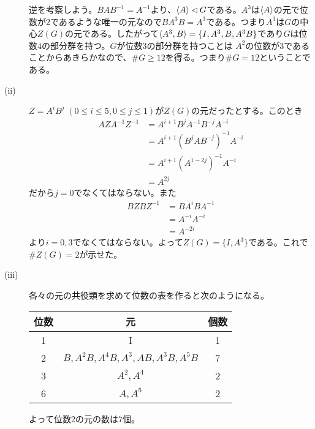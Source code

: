 \begin{sol}
\begin{description}
    逆を考察しよう。$BAB^{-1} = A^{-1}$より、$\langle A \rangle \lhd G$である。$A^3$は$\langle A \rangle$の元で位数が$2$であるような唯一の元なので$BA^3B = A^3$である。つまり$A^3$は$G$の中心$Z(G)$の元である。したがって$\langle A^3, B \rangle = \{ I, A^3, B , A^3B\}$であり$G$は位数$4$の部分群を持つ。$G$が位数$3$の部分群を持つことは
    $A^2$の位数が$3$であることからあきらかなので、$\# G \geq 12$を得る。つまり$\# G =12$ということである。
    \item[(ii)] $Z = A^i B^j \; (0 \leq i \leq 5, 0\leq j \leq 1)$が$Z(G)$の元だったとする。このとき
    \begin{align*}
      AZA^{-1}Z^{-1} &= A^{i+1} B^j A^{-1} B^{-j} A^{-i} \\
      &= A^{i+1} (B^j A B^{-j})^{-1} A^{-i} \\
      &= A^{i+1} (A^{1-2j})^{-1} A^{-i} \\
      &= A^{2j}
    \end{align*}
    だから$j=0$でなくてはならない。また
    \begin{align*}
      BZBZ^{-1} &= BA^i B A^{-1} \\
      &= A^{-i } A^{-i} \\
      &= A^{-2i}
    \end{align*}
    より$i=0,3$でなくてはならない。よって$Z(G)= \{ I, A^3 \}$である。これで$\# Z(G)=2$が示せた。
    \item[(iii)] 各々の元の共役類を求めて位数の表を作ると次のようになる。
    \begin{center}
    \begin{tabular}{ccc}
     \hline
  位数 & 元 & 個数 \\
     \hline \hline
     1 & I & 1 \\
     2 & $B,A^2B, A^4B, A^3, AB, A^3B, A^5B$ &  7 \\
    3 & $A^2, A^4$ &  2  \\
    6 & $A, A^5$ & 2
     \end{tabular}
    \end{center}
    よって位数$2$の元の数は$7$個。
  \end{description}
\end{sol}
\newpage


